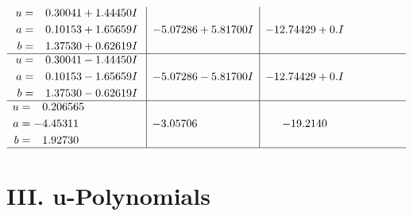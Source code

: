 \documentclass[1p]{elsarticle_modified}
\theoremstyle{definition}
\begin{document}
$$\begin{array}{c|c|c}
\begin{aligned}
u &= \phantom{-}0.30041 + 1.44450 I \\
a &= \phantom{-}0.10153 + 1.65659 I \\
b &= \phantom{-}1.37530 + 0.62619 I\end{aligned}
 & -5.07286 + 5.81700 I & -12.74429 + 0. I\phantom{ +0.000000I} \\ \hline\begin{aligned}
u &= \phantom{-}0.30041 - 1.44450 I \\
a &= \phantom{-}0.10153 - 1.65659 I \\
b &= \phantom{-}1.37530 - 0.62619 I\end{aligned}
 & -5.07286 - 5.81700 I & -12.74429 + 0. I\phantom{ +0.000000I} \\ \hline\begin{aligned}
u &= \phantom{-}0.206565\phantom{ +0.000000I} \\
a &= -4.45311\phantom{ +0.000000I} \\
b &= \phantom{-}1.92730\phantom{ +0.000000I}\end{aligned}
 & -3.05706\phantom{ +0.000000I} & -19.2140\phantom{ +0.000000I}\\
 \hline 
 \end{array}$$\newpage
\newpage\renewcommand{\arraystretch}{1}
\centering \section*{ III. u-Polynomials}
\end{document}
